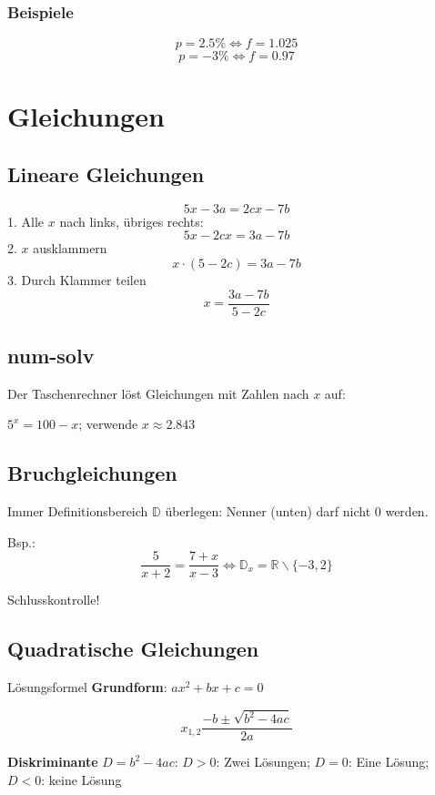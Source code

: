 \begin{multicols}{2}
\subsubsection{Beispiele}
$$p = 2.5\% \Longleftrightarrow{} f = 1.025$$
$$p = -3\% \Longleftrightarrow{} f = 0.97$$


\section{Gleichungen}

\subsection{Lineare Gleichungen}
$$5x-3a = 2cx-7b$$
1. Alle $x$ nach links, übriges rechts:
$$5x - 2cx = 3a-7b$$
2. $x$ ausklammern
$$x\cdot{}(5-2c) = 3a-7b$$
3. Durch Klammer teilen
$$x = \frac{3a-7b}{5-2c}$$


\subsection{num-solv}
Der Taschenrechner löst Gleichungen mit Zahlen nach $x$ auf:

$5^x = 100 -x$; verwende  $x\approx{}2.843$



\subsection{Bruchgleichungen}
Immer Definitionsbereich $\mathbb{D}$ überlegen: Nenner (unten) darf
nicht 0 werden.

Bsp.: $$\frac5{x+2}=\frac{7+x}{x-3} \Leftrightarrow{} \mathbb{D}_x=\mathbb{R}\backslash{}\{-3, 2\}$$

Schlusskontrolle!


\end{multicols}
\newpage

\subsection{Quadratische Gleichungen}
\begin{gesetz}{Lösungsformel}{}
\textbf{Grundform}: $ax^2 + bx+c = 0$

$$x_{1,2}\frac{-b \pm \sqrt{b^2-4ac}}{2a}$$
\end{gesetz}

\textbf{Diskriminante} $D = b^2-4ac$:
$D>0$: Zwei Lösungen;
$D=0$: Eine Lösung;
$D<0$: keine Lösung

